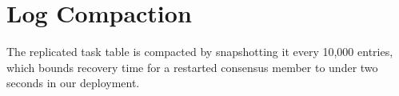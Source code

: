 \chapter{Log Compaction}
\label{app:a}

The replicated task table is compacted by snapshotting it every 10,000 entries, which bounds
recovery time for a restarted consensus member to under two seconds in our deployment.
